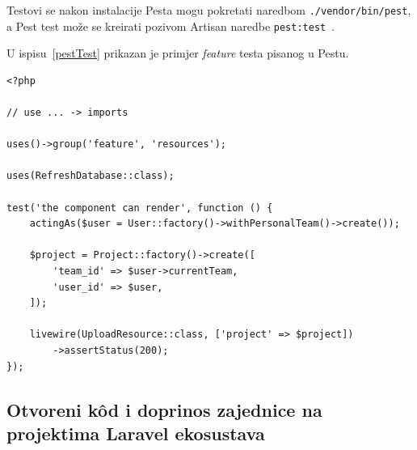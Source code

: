 Testovi se nakon instalacije Pesta mogu pokretati naredbom \texttt{./vendor/bin/pest}, a Pest test može se kreirati pozivom Artisan naredbe \texttt{pest:test}~\cite{pestInstallation}.

U ispisu~\ref{pestTest} prikazan je primjer \textit{feature} testa pisanog u Pestu.

\begin{lstlisting}[caption={\texttt{UploadResourceTest} - \texttt{test 'the component can render'}}, label=pestTest]
<?php

// use ... -> imports

uses()->group('feature', 'resources');

uses(RefreshDatabase::class);

test('the component can render', function () {
    actingAs($user = User::factory()->withPersonalTeam()->create());

    $project = Project::factory()->create([
        'team_id' => $user->currentTeam,
        'user_id' => $user,
    ]);

    livewire(UploadResource::class, ['project' => $project])
        ->assertStatus(200);
});

\end{lstlisting}

\subsection{Otvoreni k\^od i doprinos zajednice na projektima Laravel ekosustava}
